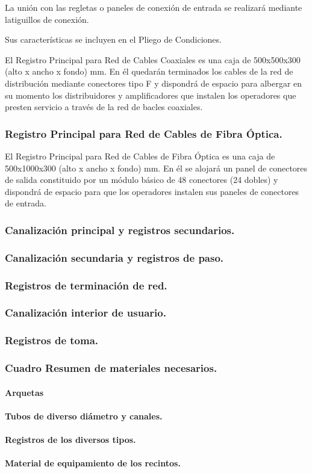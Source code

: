 La unión con las regletas o paneles de conexión de entrada se realizará mediante latiguillos de conexión.

Sus características se incluyen en el Pliego de Condiciones.

El Registro Principal para Red de Cables Coaxiales es una caja de 500x500x300 (alto x ancho x fondo) mm.
En él quedarán terminados los cables de la red de distribución mediante conectores tipo F y dispondrá de espacio para albergar en su momento los distribuidores y amplificadores que instalen los operadores que presten servicio a través de la red de bacles coaxiales.

\subsubsection*{Registro Principal para Red de Cables de Fibra Óptica.}
El Registro Principal para Red de Cables de Fibra Óptica es una caja de 500x1000x300 (alto x ancho x fondo) mm.
En él se alojará un panel de conectores de salida constituido por un módulo básico de 48 conectores (24 dobles) y dispondrá de espacio para que los operadores instalen sus paneles de conectores de entrada.
\subsubsection{Canalización principal y registros secundarios.}
\subsubsection{Canalización secundaria y registros de paso.}
\subsubsection{Registros de terminación de red.}
\subsubsection{Canalización interior de usuario.}
\subsubsection{Registros de toma.}
\subsubsection{Cuadro Resumen de materiales necesarios.}
\paragraph{Arquetas}
\paragraph{Tubos de diverso diámetro y canales.}
\paragraph{Registros de los diversos tipos.}
\paragraph{Material de equipamiento de los recintos.}